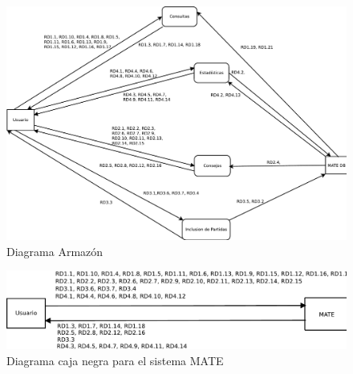 \begin{figure}[h!]
\centering
\includegraphics[width=0.7\linewidth]{../Diagramas/pdf/Armazon.pdf}
\caption{Diagrama Armazón}
\label{fig:Armazon}
\end{figure}


\begin{figure}[h!]
\centering
\includegraphics[width=0.7\linewidth]{../Diagramas/pdf/CajaNegra.pdf}
\caption{Diagrama caja negra para el sistema MATE}
\label{fig:CajaNegra}
\end{figure}
